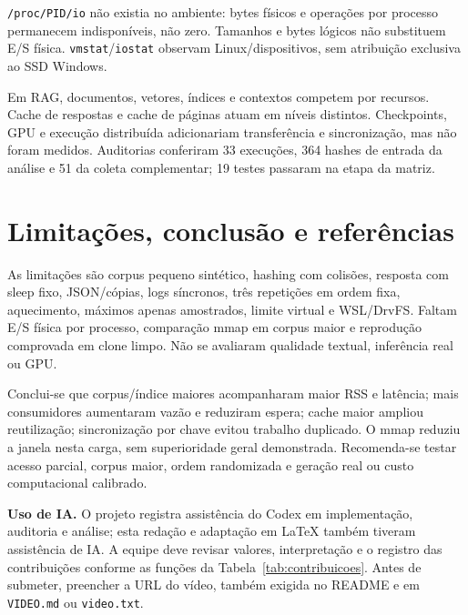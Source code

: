 \documentclass[12pt,a4paper]{article}
\newcommand{\secao}[1]{\clearpage\section{#1}}
\begin{document}
  \texttt{/proc/PID/io} não existia no ambiente: bytes físicos e operações por processo permanecem indisponíveis, não zero. Tamanhos e bytes lógicos não substituem E/S física. \texttt{vmstat}/\texttt{iostat} observam Linux/dispositivos, sem atribuição exclusiva ao SSD Windows.
  
  Em RAG, documentos, vetores, índices e contextos competem por recursos. Cache de respostas e cache de páginas atuam em níveis distintos. Checkpoints, GPU e execução distribuída adicionariam transferência e sincronização, mas não foram medidos. Auditorias conferiram 33 execuções, 364 hashes de entrada da análise e 51 da coleta complementar; 19 testes passaram na etapa da matriz.
  
  \secao{Limitações, conclusão e referências}
  As limitações são corpus pequeno sintético, hashing com colisões, resposta com sleep fixo, JSON/cópias, logs síncronos, três repetições em ordem fixa, aquecimento, máximos apenas amostrados, limite virtual e WSL/DrvFS. Faltam E/S física por processo, comparação mmap em corpus maior e reprodução comprovada em clone limpo. Não se avaliaram qualidade textual, inferência real ou GPU.
  
  Conclui-se que corpus/índice maiores acompanharam maior RSS e latência; mais consumidores aumentaram vazão e reduziram espera; cache maior ampliou reutilização; sincronização por chave evitou trabalho duplicado. O mmap reduziu a janela nesta carga, sem superioridade geral demonstrada. Recomenda-se testar acesso parcial, corpus maior, ordem randomizada e geração real ou custo computacional calibrado.
  
  \noindent\textbf{Uso de IA.} O projeto registra assistência do Codex em implementação, auditoria e análise; esta redação e adaptação em LaTeX também tiveram assistência de IA. A equipe deve revisar valores, interpretação e o registro das contribuições conforme as funções da Tabela~\ref{tab:contribuicoes}. Antes de submeter, preencher a URL do vídeo, também exigida no README e em \texttt{VIDEO.md} ou \texttt{video.txt}.
  
\end{document}
